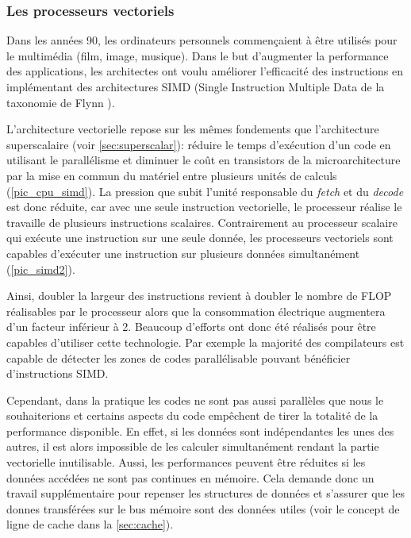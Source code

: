 \subsubsection{Les processeurs vectoriels } \label{sec:cpu_vectoriel}

Dans les années 90, les ordinateurs personnels commençaient à être utilisés pour le multimédia (film, image, musique). Dans le but d'augmenter la performance des applications, les architectes ont voulu améliorer l'efficacité des instructions en implémentant des architectures SIMD (Single Instruction Multiple Data de la taxonomie de Flynn ). 

L'architecture vectorielle repose sur les mêmes fondements que l'architecture superscalaire (voir \autoref{sec:superscalar}): réduire le temps d'exécution d'un code en utilisant le parallélisme et diminuer le coût en transistors de la microarchitecture par la mise en commun du matériel entre plusieurs unités de calculs (\autoref{pic_cpu_simd}). La pression que subit l'unité responsable du \textit{fetch} et du \textit{decode} est donc réduite, car avec une seule instruction vectorielle, le processeur réalise le travaille de plusieurs instructions scalaires.  Contrairement au processeur scalaire qui exécute une instruction sur une seule donnée, les processeurs vectoriels sont capables d'exécuter une instruction sur plusieurs données simultanément (\autoref{pic_simd2}).


Ainsi, doubler la largeur des instructions revient à doubler le nombre de FLOP réalisables par le processeur alors que la consommation électrique augmentera d'un facteur inférieur à 2. Beaucoup d'efforts ont donc été réalisés pour être capables d'utiliser cette technologie. Par exemple la majorité des compilateurs est capable de détecter les zones de codes parallélisable pouvant bénéficier d'instructions SIMD.

Cependant, dans la pratique les codes ne sont pas aussi parallèles que nous le souhaiterions et certains aspects du code empêchent de tirer la totalité de la performance disponible. En effet, si les données sont indépendantes les unes des autres, il est alors impossible de les calculer simultanément rendant la partie vectorielle inutilisable. Aussi, les performances peuvent être réduites si les données accédées ne sont pas continues en mémoire. Cela demande donc un travail supplémentaire pour repenser les structures de données et s'assurer que les donnes transférées sur le bus mémoire sont des données utiles (voir le concept de ligne de cache dans la \autoref{sec:cache}).

